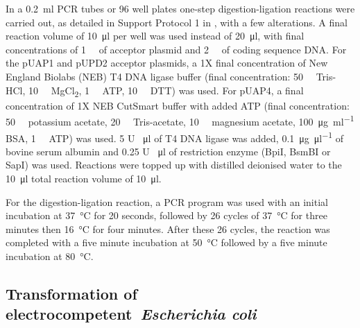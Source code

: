 \documentclass[../main.tex]{subfiles}
\begin{document}
In a \SI{0.2}{\milli\litre} PCR tubes or 96 well plates one-step digestion-ligation reactions were carried out, as detailed in Support Protocol 1 in \textcite*{patronDNAAssemblyPlant2016}, with a few alterations.
A final reaction volume of \SI{10}{\micro\litre} per well was used instead of \SI{20}{\micro\litre}, with final concentrations of \SI{1}{\nano\Molar} of acceptor
plasmid and \SI{2}{\nano\Molar} of coding sequence DNA.
For the pUAP1 and pUPD2 acceptor plasmids, a 1X final concentration of New England Biolabs (NEB) T4 DNA ligase buffer (final concentration: \SI{50}{\milli\Molar} Tris-HCl, \SI{10}{\milli\Molar} MgCl\textsubscript{2}, \SI{1}{\milli\Molar} ATP, \SI{10}{\milli\Molar} DTT) was used.
For pUAP4, a final concentration of 1X NEB CutSmart buffer with added ATP (final concentration: \SI{50}{\milli\Molar} potassium acetate, \SI{20}{\milli\Molar} Tris-acetate, \SI{10}{\milli\Molar} magnesium acetate, \SI{100}{\micro\gram\per\ml} BSA, \SI{1}{\milli\Molar} ATP) was used.
5 U \si{\per\ul} of T4 DNA ligase was added, \SI{0.1}{\micro\gram\per\ul} of bovine serum albumin and 0.25 U \si{\per\micro\litre} of restriction enzyme (BpiI, BsmBI or SapI) was used. Reactions were topped up with distilled deionised water to the \SI{10}{\micro\litre} total reaction volume of \SI{10}{\micro\litre}.

For the digestion-ligation reaction, a PCR program was used with an initial incubation at \SI{37}{\degreeCelsius} for 20 seconds, followed by 26 cycles of \SI{37}{\degreeCelsius} for three minutes then \SI{16}{\degreeCelsius} for four minutes.
After these 26 cycles, the reaction was completed with a five minute incubation at \SI{50}{\degreeCelsius} followed by a five minute incubation at \SI{80}{\degreeCelsius}.

\subsection{Transformation of electrocompetent~\textit{Escherichia coli}}\label{chapter2:methods:transformation-of-electrocompetent-escherichia-coli}
\end{document}
